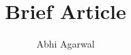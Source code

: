 \documentclass[11pt, oneside]{article}
\title{Brief Article}
\author{Abhi Agarwal}
\date{}
\begin{document}
\maketitle

\par 
\end{document}
